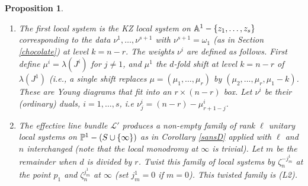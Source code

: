 \documentclass[11pt]{amsart}
\newcommand\ml{\mathcal{L}}
\newtheorem{proposition}[theorem]{Proposition}
\numberwithin{theorem}{subsection}
\begin{document}
{\begin{proposition}
\begin{enumerate}
\item[(L1)] The first local system is the KZ local system on $\Bbb{A}^1-\{z_1,\dots,z_s\}$ corresponding to the data $\nu^1,\dots,\nu^{s+1}$ with $\nu^{s+1}=\omega_1$ (as in Section \ref{chocolate}) at level $k=n-r$.
The weights $\nu^i$ are defined as follows. First define $\mu^i=\lambda(J^i)$ for $j\neq1$, and $\mu^1$ the $d$-fold shift at level $k=n-r$ of $\lambda(J^1)$ (i.e., a single shift replaces $\mu=(\mu_1,\dots,\mu_r)$ by $(\mu_2,\dots,\mu_r,\mu_1-k)$. These are Young diagrams that fit into an $r\times (n-r)$ box. Let $\nu^i$ be their (ordinary) duals, $i=1,\dots,s$, i.e $\nu^i_j= (n-r)-\mu^i_{r+1-j}$.
\item[(L2)]The effective line bundle $\ml'$ produces a non-empty family of  rank $\ell$ unitary local systems on $\Bbb{P}^1-(S\cup\{\infty\})$ as in Corollary \ref{sansD} applied with $\ell$ and $n$ interchanged (note that the local monodromy at $\infty$ is trivial).  Let $m$ be the remainder when $d$ is divided by $r$. Twist this family of local systems by $\zeta_n^{-j^1_m}$ at the point $p_1$ and $\zeta_n^{j^1_{m}}$ at $\infty$ (set $j^1_m=0$ if $m=0$). This twisted family is (L2).
\end{enumerate}


\end{proposition}}
\end{document}
